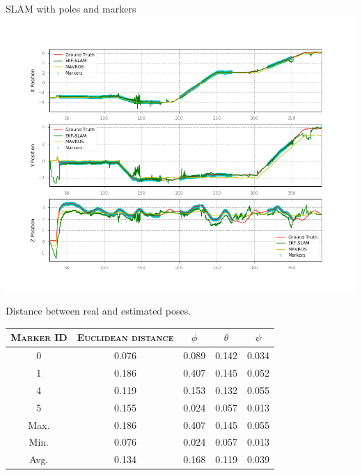 \documentclass[serif]{beamer}
\begin{document}
    \begin{frame}[nonumber]{SLAM with poles and markers}
        \centering
        \includegraphics[width=0.7\linewidth]{Images/fig22-true-poles-markers-nomap.png}
    \end{frame}
    \begin{frame}[nonumber]{Distance between real and estimated poses.}

         \centering
        \begin{tabular}{ccccc}
            \toprule
            \textsc{Marker ID} & \textsc{Euclidean distance} & \textsc{$\phi$} & \textsc{$\theta$} & \textsc{$\psi$} \\
            \midrule
            0 & 0.076 & 0.089 & 0.142 & 0.034\\
            1 & 0.186 & 0.407 & 0.145 & 0.052\\
            4 & 0.119 & 0.153 & 0.132 & 0.055\\
            5 & 0.155 & 0.024 & 0.057 & 0.013\\
            \midrule
            Max. & 0.186 & 0.407 & 0.145 & 0.055\\
            Min. & 0.076 & 0.024 & 0.057 & 0.013\\
            Avg. & 0.134 & 0.168 & 0.119 & 0.039\\
            \bottomrule
        \end{tabular}
    \end{frame}
\end{document}
